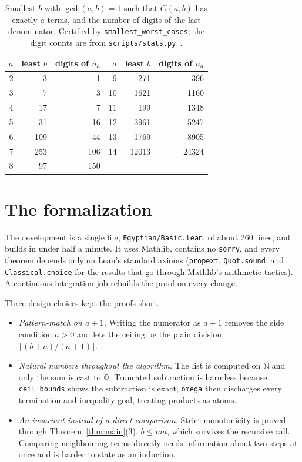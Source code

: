 \documentclass[11pt]{article}
\theoremstyle{definition}
\theoremstyle{remark}
\begin{document}
\begin{table}[h]
\centering
\begin{tabular}{rrr@{\qquad}rrr}
\toprule
$a$ & least $b$ & digits of $n_a$ & $a$ & least $b$ & digits of $n_a$ \\
\midrule
2 & 3 & 1 & 9 & 271 & 396 \\
3 & 7 & 3 & 10 & 1621 & 1160 \\
4 & 17 & 7 & 11 & 199 & 1348 \\
5 & 31 & 16 & 12 & 3961 & 5247 \\
6 & 109 & 44 & 13 & 1769 & 8905 \\
7 & 253 & 106 & 14 & 12013 & 24324 \\
8 & 97 & 150 & & & \\
\bottomrule
\end{tabular}
\caption{Smallest $b$ with $\gcd(a,b)=1$ such that $G(a,b)$ has exactly $a$ terms, and the
number of digits of the last denominator. Certified by \texttt{smallest\_worst\_cases};
the digit counts are from \texttt{scripts/stats.py}~\cite{repo}.}
\label{tab:worst}
\end{table}

\section{The formalization}

The development is a single file, \texttt{Egyptian/Basic.lean}, of about 260 lines, and builds
in under half a minute. It uses Mathlib, contains no \texttt{sorry}, and every theorem depends
only on Lean's standard axioms (\texttt{propext}, \texttt{Quot.sound}, and
\texttt{Classical.choice} for the results that go through Mathlib's arithmetic tactics).
A continuous integration job rebuilds the proof on every change.

Three design choices kept the proofs short.
\begin{itemize}
  \item \emph{Pattern-match on $a+1$.} Writing the numerator as $a+1$ removes the side condition
    $a > 0$ and lets the ceiling be the plain division $\lfloor (b+a)/(a+1) \rfloor$.
  \item \emph{Natural numbers throughout the algorithm.} The list is computed on $\mathbb{N}$ and
    only the sum is cast to $\mathbb{Q}$. Truncated subtraction is harmless because
    \texttt{ceil\_bounds} shows the subtraction is exact; \texttt{omega} then discharges every
    termination and inequality goal, treating products as atoms.
  \item \emph{An invariant instead of a direct comparison.} Strict monotonicity is proved through
    Theorem~\ref{thm:main}(3), $b \le m a$, which survives the recursive call. Comparing
    neighbouring terms directly needs information about two steps at once and is harder to
    state as an induction.
\end{itemize}
\end{document}
